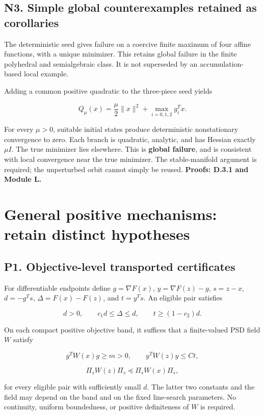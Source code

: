 \subsection{N3. Simple global counterexamples retained as corollaries}\label{n3.-simple-global-counterexamples-retained-as-corollaries}

The deterministic seed gives failure on a coercive finite maximum of four affine functions, with a unique minimizer. This retains global failure in the finite polyhedral and semialgebraic class. It is not superseded by an accumulation-based local example.

Adding a common positive quadratic to the three-piece seed yields

\[
 Q_\mu(x)=\frac\mu2\|x\|^2+\max_{i=0,1,2}g_i^Tx.
\]

For every \(\mu>0\), suitable initial states produce deterministic nonstationary convergence to zero. Each branch is quadratic, analytic, and has Hessian exactly \(\mu I\). The true minimizer lies elsewhere. This is \textbf{global failure}, and is consistent with local convergence near the true minimizer. The stable-manifold argument is required; the unperturbed orbit cannot simply be reused. \textbf{Proofs: D.3.1 and Module L.}

\section{General positive mechanisms: retain distinct hypotheses}\label{general-positive-mechanisms-retain-distinct-hypotheses}

\subsection{P1. Objective-level transported certificates}\label{p1.-objective-level-transported-certificates}

For differentiable endpoints define \(g=\nabla F(x)\), \(y=\nabla F(z)-g\), \(s=z-x\), \(d=-g^Ts\), \(\Delta=F(x)-F(z)\), and \(t=y^Ts\). An eligible pair satisfies

\[d>0,\qquad c_1d\le\Delta\le d,\qquad t\ge(1-c_2)d.\]

On each compact positive objective band, it suffices that a finite-valued PSD field \(W\) satisfy

\[g^TW(x)g\ge m>0,\qquad y^TW(z)y\le Ct,\]

\[\Pi_sW(z)\Pi_s\preceq\Pi_sW(x)\Pi_s,\]

for every eligible pair with sufficiently small \(d\). The latter two constants and the field may depend on the band and on the fixed line-search parameters. No continuity, uniform boundedness, or positive definiteness of \(W\) is required.

